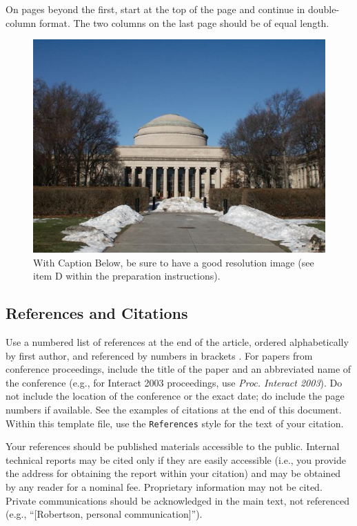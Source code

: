 \documentclass{sigchi}
\begin{document}
On pages beyond the first, start at the top of the page and continue
in double-column format.  The two columns on the last page should be
of equal length.

\begin{figure}[!h]
\centering
\includegraphics[width=0.9\columnwidth]{Figure1}
\caption{With Caption Below, be sure to have a good resolution image
  (see item D within the preparation instructions).}
\label{fig:figure1}
\end{figure}

\subsection{References and Citations}

Use a numbered list of references at the end of the article, ordered
alphabetically by first author, and referenced by numbers in brackets
\cite{ethics,
  Klemmer:2002:WSC:503376.503378,
  Mather:2000:MUT,
  Zellweger:2001:FAO:504216.504224}. For
papers from conference proceedings, include the title of the paper and
an abbreviated name of the conference (e.g., for Interact 2003
proceedings, use \textit{Proc. Interact 2003}). Do not include the
location of the conference or the exact date; do include the page
numbers if available. See the examples of citations at the end of this
document. Within this template file, use the \texttt{References} style
for the text of your citation.

Your references should be published materials accessible to the
public.  Internal technical reports may be cited only if they are
easily accessible (i.e., you provide the address for obtaining the
report within your citation) and may be obtained by any reader for a
nominal fee.  Proprietary information may not be cited. Private
communications should be acknowledged in the main text, not referenced
(e.g., ``[Robertson, personal communication]'').
\end{document}
